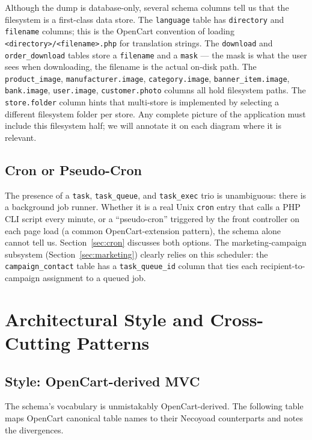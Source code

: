 \documentclass[11pt,a4paper]{article}
\begin{document}
Although the dump is database-only, several schema columns tell us that
the filesystem is a first-class data store. The \texttt{language} table
has \texttt{directory} and \texttt{filename} columns; this is the OpenCart
convention of loading \texttt{<directory>/<filename>.php} for translation
strings. The \texttt{download} and \texttt{order\_download} tables store
a \texttt{filename} and a \texttt{mask} --- the mask is what the user sees
when downloading, the filename is the actual on-disk path. The
\texttt{product\_image}, \texttt{manufacturer.image},
\texttt{category.image}, \texttt{banner\_item.image},
\texttt{bank.image}, \texttt{user.image}, \texttt{customer.photo}
columns all hold filesystem paths. The \texttt{store.folder} column
hints that multi-store is implemented by selecting a different
filesystem folder per store. Any complete picture of the application
must include this filesystem half; we will annotate it on each diagram
where it is relevant.

\subsection{Cron or Pseudo-Cron}

The presence of a \texttt{task}, \texttt{task\_queue}, and
\texttt{task\_exec} trio is unambiguous: there is a background job
runner. Whether it is a real Unix \texttt{cron} entry that calls a PHP
CLI script every minute, or a ``pseudo-cron'' triggered by the front
controller on each page load (a common OpenCart-extension pattern), the
schema alone cannot tell us. Section~\ref{sec:cron} discusses both
options. The marketing-campaign subsystem (Section~\ref{sec:marketing})
clearly relies on this scheduler: the \texttt{campaign\_contact}
table has a \texttt{task\_queue\_id} column that ties each
recipient-to-campaign assignment to a queued job.

\section{Architectural Style and Cross-Cutting Patterns}\label{sec:style}

\subsection{Style: OpenCart-derived MVC}

The schema's vocabulary is unmistakably OpenCart-derived. The following
table maps OpenCart canonical table names to their Necoyoad counterparts
and notes the divergences.
\end{document}
